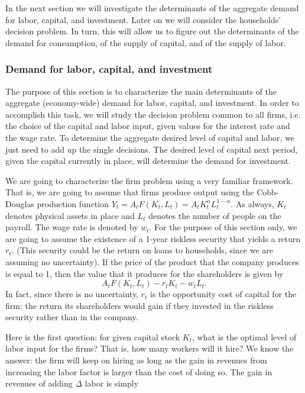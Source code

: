 \documentclass[letterpaper,12pt]{article}
\begin{document}
In the next section we will investigate the determinants of the
aggregate demand for labor, capital, and investment. Later on we
will consider the households' decision problem. In turn, this will
allow us to figure out the determinants of the demand for
consumption, of the supply of capital, and of the supply of labor.

\subsubsection*{Demand for labor, capital, and investment}\label{sec:firm}

The purpose of this section is to characterize the main
determinants of the aggregate (economy-wide) demand for labor,
capital, and investment. In order to accomplish this task, we will
study the decision problem common to all firms, i.e. the choice of
the capital and labor input, given values for the interest rate
and the wage rate. To determine the aggregate desired level of
capital and labor, we just need to add up the single decisions.
The desired level of capital next period, given the capital
currently in place, will determine the demand for investment.

We are going to characterize the firm problem using a very
familiar framework. That is, we are going to assume that firms
produce output using the Cobb-Douglas production function
$Y_{t}=A_{t}F(K_{t},L_{t})=A_{t}K_{t}^{\alpha}L_{t}^{1-\alpha}$.
As always, $K_{t}$ denotes physical assets in place and $L_{t}$
denotes the number of people on the payroll. The wage rate is
denoted by $w_{t}$. For the purpose of this section only, we are
going to assume the existence of a 1-year riskless security that
yields a return $r_{t}$. (This security could be the return on
loans to households, since we are assuming no uncertainty). If the
price of the product that the company produces is equal to 1, then
the value that it produces for the shareholders is given by
%
\begin{equation*}
A_{t}F(K_{t},L_{t})-r_{t}K_{t}-w_{t}L_{t}.
\end{equation*}
%
In fact, since there is no uncertainty, $r_{t}$ is the opportunity cost of capital for the firm:
the return its shareholders would gain if they invested in the riskless security rather than in
the company.

Here is the first question: for given capital stock $K_{t}$, what
is the optimal level of labor input for the firms? That is, how
many workers will it hire? We know the answer: the firm will keep
on hiring as long as the gain in revenues from increasing the
labor factor is larger than the cost of doing so. The gain in
revenues of adding $\Delta$ labor is simply
\end{document}
